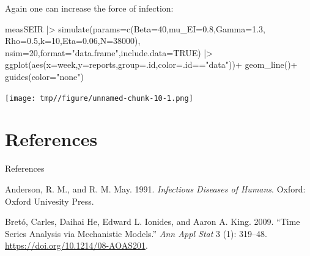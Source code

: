 \documentclass[
  ignorenonframetext,
  aspectratio=169,
  t]{beamer}
\newenvironment{Shaded}{\begin{snugshade}}{\end{snugshade}}
\newcommand{\AttributeTok}[1]{\textcolor[rgb]{0.40,0.45,0.13}{#1}}
\newcommand{\ConstantTok}[1]{\textcolor[rgb]{0.56,0.35,0.01}{#1}}
\newcommand{\DecValTok}[1]{\textcolor[rgb]{0.68,0.00,0.00}{#1}}
\newcommand{\FloatTok}[1]{\textcolor[rgb]{0.68,0.00,0.00}{#1}}
\newcommand{\FunctionTok}[1]{\textcolor[rgb]{0.28,0.35,0.67}{#1}}
\newcommand{\NormalTok}[1]{\textcolor[rgb]{0.00,0.23,0.31}{#1}}
\newcommand{\SpecialCharTok}[1]{\textcolor[rgb]{0.37,0.37,0.37}{#1}}
\newcommand{\StringTok}[1]{\textcolor[rgb]{0.13,0.47,0.30}{#1}}
\newlength{\cslhangindent}
\newenvironment{CSLReferences}[2] %
 {\begin{list}{}{%
  \setlength{\itemindent}{0pt}
  \setlength{\leftmargin}{0pt}
  \setlength{\parsep}{0pt}
  \ifodd #1
   \setlength{\leftmargin}{\cslhangindent}
   \setlength{\itemindent}{-1\cslhangindent}
  \fi
  \setlength{\itemsep}{#2\baselineskip}}}
 {\end{list}}
\theoremstyle{definition}
\begin{document}
\begin{frame}[fragile]
Again one can increase the force of infection:

\begin{Shaded}
\begin{Highlighting}[]
\NormalTok{measSEIR }\SpecialCharTok{|\textgreater{}} 
  \FunctionTok{simulate}\NormalTok{(}\AttributeTok{params=}\FunctionTok{c}\NormalTok{(}\AttributeTok{Beta=}\DecValTok{40}\NormalTok{,}\AttributeTok{mu\_EI=}\FloatTok{0.8}\NormalTok{,}\AttributeTok{Gamma=}\FloatTok{1.3}\NormalTok{,}
                    \AttributeTok{Rho=}\FloatTok{0.5}\NormalTok{,}\AttributeTok{k=}\DecValTok{10}\NormalTok{,}\AttributeTok{Eta=}\FloatTok{0.06}\NormalTok{,}\AttributeTok{N=}\DecValTok{38000}\NormalTok{),}
  \AttributeTok{nsim=}\DecValTok{20}\NormalTok{,}\AttributeTok{format=}\StringTok{"data.frame"}\NormalTok{,}\AttributeTok{include.data=}\ConstantTok{TRUE}\NormalTok{) }\SpecialCharTok{|\textgreater{}}
  \FunctionTok{ggplot}\NormalTok{(}\FunctionTok{aes}\NormalTok{(}\AttributeTok{x=}\NormalTok{week,}\AttributeTok{y=}\NormalTok{reports,}\AttributeTok{group=}\NormalTok{.id,}\AttributeTok{color=}\NormalTok{.id}\SpecialCharTok{==}\StringTok{"data"}\NormalTok{))}\SpecialCharTok{+}
  \FunctionTok{geom\_line}\NormalTok{()}\SpecialCharTok{+}
  \FunctionTok{guides}\NormalTok{(}\AttributeTok{color=}\StringTok{"none"}\NormalTok{)}
\end{Highlighting}
\end{Shaded}

\begin{center}
\texttt{[image: tmp//figure/unnamed-chunk-10-1.png]}
\end{center}
\end{frame}

\section{References}\label{references}

\begin{frame}[allowframebreaks]{References}
\label{references-1}
\label{refs}
\begin{CSLReferences}{1}{0}
Anderson, R. M., and R. M. May. 1991. \emph{Infectious Diseases of
Humans}. Oxford: Oxford Univesity Press.

Bretó, Carles, Daihai He, Edward L. Ionides, and Aaron A. King. 2009.
{``Time Series Analysis via Mechanistic Models.''} \emph{Ann Appl Stat}
3 (1): 319--48. \url{https://doi.org/10.1214/08-AOAS201}.

\end{CSLReferences}
\end{frame}
\end{document}
